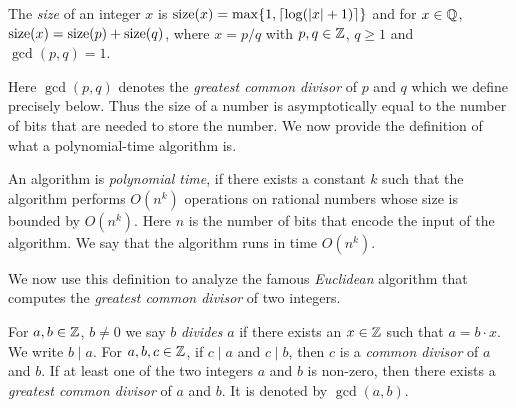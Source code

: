 \begin{definition}
  \label{def:2}
  The \emph{size} of an integer $x$
  is $\operatorname{size}(x) = \max\{1, \lceil\log( |x| +1)\rceil\}$
  and for $x \in \mathbb{Q}$,
  $\operatorname{size}(x) = \operatorname{size}(p)+\operatorname{size}(q)$,
  where $x = p/q$ with $p,q \in \mathbb{Z}$, $q\geq1$ and $\gcd(p,q)=1$.   
\end{definition}
Here $\gcd(p,q)$ denotes the \emph{greatest common divisor} of $p$ and $q$ which we define precisely below. 
Thus the size of a number is asymptotically equal to the number of
bits that are needed to store the number.  We now provide the
definition of what a polynomial-time algorithm is.
\begin{definition}
  \label{def:1}
  An algorithm is \emph{polynomial time}, if there exists a
  constant $k$
  such that the algorithm performs $O(n^k)$
  operations on rational numbers whose size is bounded by
  $O(n^k)$.
  Here $n$
  is the number of bits that encode the input of the algorithm. We say that the algorithm runs in time $O(n^k)$. 
\end{definition}

We now use this definition to analyze the famous \emph{Euclidean} algorithm that computes the \emph{greatest common divisor} of two integers. 

 For $a,b \in \mathbb{Z}$, $b \neq0$ we say $b$ \emph{divides} $a$ if there
    exists an $x \in \mathbb{Z}$ such that $a = b \cdot  x$. We 
    write    $b\mid a$.  
   For $a,b,c \in \mathbb{Z}$, if $c\mid a$ and $c\mid b$, then $c$ is a
    \emph{common divisor} of $a$ and $b$. 
    If at least one of the two integers $a$ and $b$ is non-zero,
    then there exists a \emph{greatest common divisor} of $a$ and
    $b$. It is denoted by \emph{$\gcd(a,b)$}. 
    

